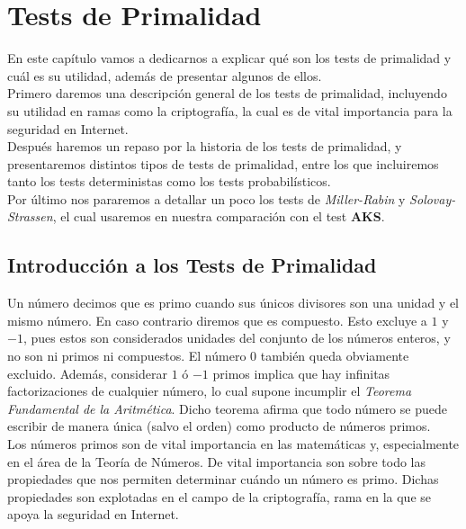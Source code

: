 \chapter{Tests de Primalidad}

En este capítulo vamos a dedicarnos a explicar qué son los tests de primalidad y cuál es su utilidad, además de presentar algunos de ellos.\\

Primero daremos una descripción general de los tests de primalidad, incluyendo su utilidad en ramas como la criptografía, la cual es de vital importancia para la seguridad en Internet.\\

Después haremos un repaso por la historia de los tests de primalidad, y presentaremos distintos tipos de tests de primalidad, entre los que incluiremos tanto los tests deterministas como los tests probabilísticos.\\

Por último nos pararemos a detallar un poco los tests de \textit{Miller-Rabin} y \textit{Solovay-Strassen}, el cual usaremos en nuestra comparación con el test \textbf{AKS}.

\section{Introducción a los Tests de Primalidad}

Un número decimos que es primo cuando sus únicos divisores son una unidad y el mismo número. En caso contrario diremos que es compuesto. Esto excluye a $1$ y $-1$, pues estos son considerados unidades del conjunto de los números enteros, y no son ni primos ni compuestos. El número $0$ también queda obviamente excluido. Además, considerar $1$ ó $-1$ primos implica que hay infinitas factorizaciones de cualquier número, lo cual supone incumplir el \textit{Teorema Fundamental de la Aritmética}. Dicho teorema afirma que todo número se puede escribir de manera única (salvo el orden) como producto de números primos.\\

Los números primos son de vital importancia en las matemáticas y, especialmente en el área de la Teoría de Números. De vital importancia son sobre todo las propiedades que nos permiten determinar cuándo un número es primo. Dichas propiedades son explotadas en el campo de la criptografía, rama en la que se apoya la seguridad en Internet.\\

